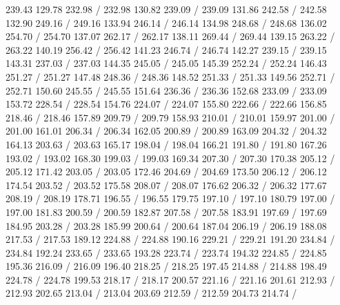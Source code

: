 { 239.43 129.78 232.98 /
 232.98 130.82 239.09 /
 239.09 131.86 242.58 /
 242.58 132.90 249.16 /
 249.16 133.94 246.14 /
 246.14 134.98 248.68 /
 248.68 136.02 254.70 /
 254.70 137.07 262.17 /
 262.17 138.11 269.44 /
 269.44 139.15 263.22 /
 263.22 140.19 256.42 /
 256.42 141.23 246.74 /
 246.74 142.27 239.15 /
 239.15 143.31 237.03 /
 237.03 144.35 245.05 /
 245.05 145.39 252.24 /
 252.24 146.43 251.27 /
 251.27 147.48 248.36 /
 248.36 148.52 251.33 /
 251.33 149.56 252.71 /
 252.71 150.60 245.55 /
 245.55 151.64 236.36 /
 236.36 152.68 233.09 /
 233.09 153.72 228.54 /
 228.54 154.76 224.07 /
 224.07 155.80 222.66 /
 222.66 156.85 218.46 /
 218.46 157.89 209.79 /
 209.79 158.93 210.01 /
 210.01 159.97 201.00 /
 201.00 161.01 206.34 /
 206.34 162.05 200.89 /
 200.89 163.09 204.32 /
 204.32 164.13 203.63 /
 203.63 165.17 198.04 /
 198.04 166.21 191.80 /
 191.80 167.26 193.02 /
 193.02 168.30 199.03 /
 199.03 169.34 207.30 /
 207.30 170.38 205.12 /
 205.12 171.42 203.05 /
 203.05 172.46 204.69 /
 204.69 173.50 206.12 /
 206.12 174.54 203.52 /
 203.52 175.58 208.07 /
 208.07 176.62 206.32 /
 206.32 177.67 208.19 /
 208.19 178.71 196.55 /
 196.55 179.75 197.10 /
 197.10 180.79 197.00 /
 197.00 181.83 200.59 /
 200.59 182.87 207.58 /
 207.58 183.91 197.69 /
 197.69 184.95 203.28 /
 203.28 185.99 200.64 /
 200.64 187.04 206.19 /
 206.19 188.08 217.53 /
 217.53 189.12 224.88 /
 224.88 190.16 229.21 /
 229.21 191.20 234.84 /
 234.84 192.24 233.65 /
 233.65 193.28 223.74 /
 223.74 194.32 224.85 /
 224.85 195.36 216.09 /
 216.09 196.40 218.25 /
 218.25 197.45 214.88 /
 214.88 198.49 224.78 /
 224.78 199.53 218.17 /
 218.17 200.57 221.16 /
 221.16 201.61 212.93 /
 212.93 202.65 213.04 /
 213.04 203.69 212.59 /
 212.59 204.73 214.74 /
}
